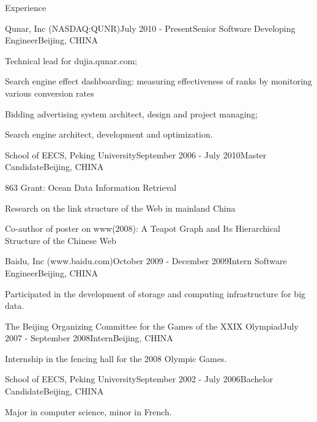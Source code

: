 \documentclass{resume} %
\begin{document}
\begin{rSection}{Experience}

\begin{rSubsection}{Qunar, Inc (NASDAQ:QUNR)}{July 2010 - Present}{Senior Software Developing Engineer}{Beijing, CHINA}
\item Technical lead for dujia.qunar.com;
\item Search engine effect dashboarding: measuring effectiveness of ranks by monitoring various conversion rates
\item Bidding advertising system architect, design and project managing;
\item Search engine architect, development and optimization.
\end{rSubsection}


\begin{rSubsection}{School of EECS, Peking University}{September 2006 - July 2010}{Master Candidate}{Beijing, CHINA}
\item 863 Grant: Ocean Data Information Retrieval
\item Research on the link structure of the Web in mainland China
\item Co-author of poster on www(2008): A Teapot Graph and Its Hierarchical Structure of the Chinese Web
\end{rSubsection}


\begin{rSubsection}{Baidu, Inc (www.baidu.com)}{October 2009 - December 2009}{Intern Software Engineer}{Beijing, CHINA}
\item Participated in the development of storage and computing infrastructure for big data.
\end{rSubsection}

\begin{rSubsection}{The Beijing Organizing Committee for the Games of
    the XXIX Olympiad}{July 2007 - September 2008}{Intern}{Beijing, CHINA}
\item Internship in the fencing hall for the 2008 Olympic Games.
\end{rSubsection}


\begin{rSubsection}{School of EECS, Peking University}{September 2002 - July 2006}{Bachelor Candidate}{Beijing, CHINA}
\item Major in computer science, minor in French.
\end{rSubsection}


\end{rSection}
\end{document}
